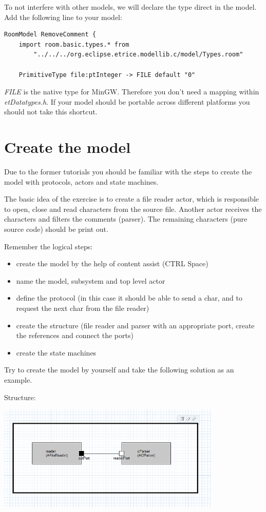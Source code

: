 To not interfere with other models, we will declare the type direct in the model.
Add the following line to your model:

\begin{small}
\begin{verbatim}
RoomModel RemoveComment {
	import room.basic.types.* from 
		"../../../org.eclipse.etrice.modellib.c/model/Types.room"
	
	PrimitiveType file:ptInteger -> FILE default "0"
\end{verbatim}
\end{small}

\textit{FILE} is the native type for MinGW. Therefore you don't need a mapping within \textit{etDatatypes.h}. If your model should be portable across different platforms you should not take this shortcut.
 
\section{Create the model}

Due to the former tutorials you should be familiar with the steps to create the model with protocols, actors and state machines.

The basic idea of the exercise is to create a file reader actor, which is responsible to open, close and read characters from the source file. Another actor receives the characters and filters the comments (parser). The remaining characters (pure source code) should be print out. 

Remember the logical steps: 
\begin{itemize}
\item create the model by the help of content assist (CTRL Space)
\item name the model, subsystem and top level actor
\item define the protocol (in this case it should be able to send a char, and to request the next char from the file reader)
\item create the structure (file reader and parser with an appropriate port, create the references and connect the ports)
\item create the state machines
\end{itemize}

Try to create the model by yourself and take the following solution as an example.

Structure:

\includegraphics[width=0.8\textwidth]{images/036-RemoveCommentC04.png}

